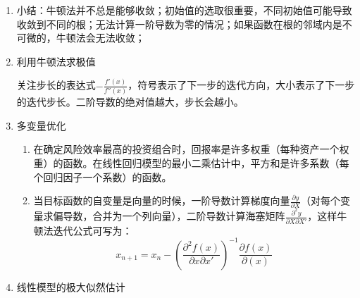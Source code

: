 \documentclass[
]{book}
\newenvironment{Shaded}{\begin{snugshade}}{\end{snugshade}}
\newcommand{\AttributeTok}[1]{\textcolor[rgb]{0.13,0.29,0.53}{#1}}
\newcommand{\CommentTok}[1]{\textcolor[rgb]{0.56,0.35,0.01}{\textit{#1}}}
\newcommand{\DecValTok}[1]{\textcolor[rgb]{0.00,0.00,0.81}{#1}}
\newcommand{\FunctionTok}[1]{\textcolor[rgb]{0.13,0.29,0.53}{\textbf{#1}}}
\newcommand{\NormalTok}[1]{#1}
\newcommand{\OtherTok}[1]{\textcolor[rgb]{0.56,0.35,0.01}{#1}}
\newcommand{\SpecialCharTok}[1]{\textcolor[rgb]{0.81,0.36,0.00}{\textbf{#1}}}
\begin{document}
\begin{enumerate}
\begin{Shaded}
\begin{Highlighting}[]
\CommentTok{\# 调用牛顿法迭代}
\NormalTok{root }\OtherTok{\textless{}{-}} \FunctionTok{newton\_raphson}\NormalTok{(}\FunctionTok{expression}\NormalTok{(x}\SpecialCharTok{\^{}}\DecValTok{2} \SpecialCharTok{{-}} \DecValTok{5}\NormalTok{), }\AttributeTok{x0 =} \DecValTok{1}\NormalTok{)}
\end{Highlighting}
\end{Shaded}

\begin{verbatim}
## Iter 1: x = 3.00000000, f(x) = -4.00000000
## Iter 2: x = 2.33333333, f(x) = 4.00000000
## Iter 3: x = 2.23809524, f(x) = 0.44444444
## Iter 4: x = 2.23606890, f(x) = 0.00907029
## Iter 5: x = 2.23606798, f(x) = 0.00000411
## Iter 6: x = 2.23606798, f(x) = 0.00000000
## Converged!
\end{verbatim}

\begin{Shaded}
\begin{Highlighting}[]
\CommentTok{\#root \textless{}{-} newton\_raphson(expression(x\^{}3 {-} 2*x\^{}2 {-}11*x +12),x0 = 2.35287527)}
\CommentTok{\#root \textless{}{-} newton\_raphson(expression(x\^{}3 {-} 2*x\^{}2 {-}11*x +12),x0 = 2.35284172)}

\CommentTok{\#root \textless{}{-} newton\_raphson(expression(2*x\^{}3+3*x\^{}2+5),x0 = 0.5)}
\CommentTok{\#root \textless{}{-} newton\_raphson(expression(2*x\^{}3+3*x\^{}2+5),x0 = 0)}
\CommentTok{\#注1： Derivative too close to zero. Stopping.}
\CommentTok{\#注2： Did not converge within max\_iter.}
\end{Highlighting}
\end{Shaded}
\item
  小结：牛顿法并不总是能够收敛；初始值的选取很重要，不同初始值可能导致收敛到不同的根；无法计算一阶导数为零的情况；如果函数在根的邻域内是不可微的，牛顿法会无法收敛；
\item
  利用牛顿法求极值

  关注步长的表达式\(-\frac{f'(x)}{f''(x)}\)，符号表示了下一步的迭代方向，大小表示了下一步的迭代步长。二阶导数的绝对值越大，步长会越小。
\item
  多变量优化

  \begin{enumerate}
  \def\labelenumii{\arabic{enumii}.}
  \item
    在确定风险效率最高的投资组合时，回报率是许多权重（每种资产一个权重）的函数。在线性回归模型的最小二乘估计中，平方和是许多系数（每个回归因子一个系数）的函数。
  \item
    当目标函数的自变量是向量的时候，一阶导数计算梯度向量\(\frac{\partial y}{\partial X}\)（对每个变量求偏导数，合并为一个列向量），二阶导数计算海塞矩阵\(\frac{\partial^2y}{\partial X\partial X'}\)，这样牛顿法迭代公式可写为：\[
    x_{n+1} = x_n - (\frac{\partial^2f(x)}{\partial x\partial x'})^{-1}\frac{\partial f(x)}{\partial(x)}
    \]
  \end{enumerate}
\item
  线性模型的极大似然估计


\end{enumerate}
\end{document}
